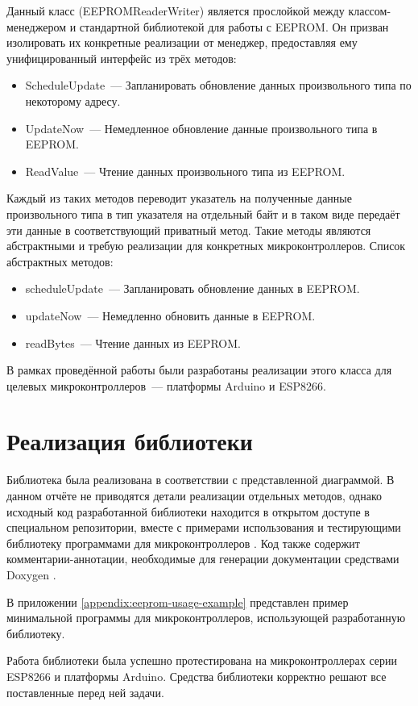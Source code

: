 Данный класс (EEPROMReaderWriter) является прослойкой между классом-менеджером и стандартной библиотекой для работы с EEPROM.
Он призван изолировать их конкретные реализации от менеджер, предоставляя ему унифицированный интерфейс из трёх методов:

\begin{itemize}
	\item ScheduleUpdate~--- Запланировать обновление данных произвольного типа по некоторому адресу.
	\item UpdateNow~---	Немедленное обновление данные произвольного типа в EEPROM.
	\item ReadValue~--- Чтение данных произвольного типа из EEPROM.
\end{itemize}

Каждый из таких методов переводит указатель на полученные данные произвольного типа в тип указателя на отдельный байт и в таком виде передаёт эти данные в соответствующий приватный метод.
Такие методы являются абстрактными и требую реализации для конкретных микроконтроллеров.
Список абстрактных методов:
\begin{itemize}
	\item scheduleUpdate~--- Запланировать обновление данных в EEPROM.
	\item updateNow~--- Немедленно обновить данные в EEPROM.
	\item readBytes~---	Чтение данных из EEPROM.
\end{itemize}

В рамках проведённой работы были разработаны реализации этого класса для целевых микроконтроллеров~--- платформы Arduino и ESP8266.


\section{Реализация библиотеки}

Библиотека была реализована в соответствии с представленной диаграммой.
В данном отчёте не приводятся детали реализации отдельных методов, однако исходный код разработанной библиотеки находится в открытом доступе в специальном репозитории, вместе с примерами использования и тестирующими библиотеку программами для микроконтроллеров \cite{web:eepromanager}.
Код также содержит комментарии-аннотации, необходимые для генерации документации средствами Doxygen \cite{web:doxygen}.

В приложении \ref{appendix:eeprom-usage-example} представлен пример минимальной программы для микроконтроллеров, использующей разработанную библиотеку.

Работа библиотеки была успешно протестирована на микроконтроллерах серии ESP8266 и платформы Arduino.
Средства библиотеки корректно решают все поставленные перед ней задачи.
